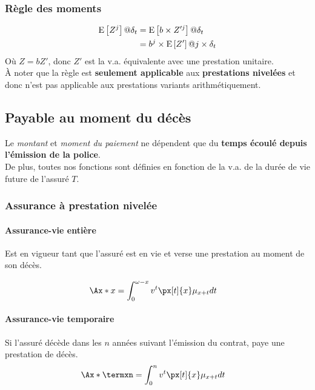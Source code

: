 \documentclass[10pt, french]{article}
\begin{document}
\begin{multicols*}{3}
\subsubsection*{Règle des moments}

\begin{align*}
	\mathrm{E} \left[ Z^{j} \right]@\delta_{t} &= \mathrm{E} \left[ b \times Z'^{j} \right]@\delta_{t} \\
	&= b^{j} \times \mathrm{E} \left[ Z' \right]@ j \times \delta_{t}
\end{align*}
Où $Z = bZ'$, donc $Z'$ est la v.a. équivalente avec une prestation unitaire.\\
À noter que la règle est \textbf{seulement applicable} aux \textbf{prestations nivelées} et donc n'est pas applicable aux prestations variants arithmétiquement.


\subsection{Payable au moment du décès}

Le \textit{montant} et \textit{moment du paiement} ne dépendent que du \textbf{temps écoulé depuis l'émission de la police}.\\
De plus, toutes nos fonctions sont définies en fonction de la v.a. de la durée de vie future de l'assuré $T$.

\subsubsection*{\textcolor{amber(sae/ece)}{Assurance à prestation nivelée}}

\paragraph{Assurance-vie entière} 

Est en vigueur tant que l'assuré est en vie et verse une prestation au moment de son décès.

\begin{align*}
\Ax*{x} 
	&= \int_{0}^{\omega - x} v^t \px[t]{x} \mu_{x+t} dt 
\end{align*}

\paragraph{Assurance-vie temporaire} Si l'assuré décède dans les $n$ années suivant l'émission du contrat, paye une prestation de décès.
\begin{align*}
\Ax*{\termxn}	
	&= \int_{0}^{n} v^t \px[t]{x} \mu_{x+t} dt 
\end{align*}


\end{multicols*}
\end{document}
